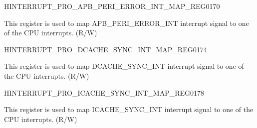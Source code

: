 \begin{register}{H}{INTERRUPT\_PRO\_APB\_PERI\_ERROR\_INT\_MAP\_REG}{\hexprefix{}0170}\label{regdesc:INTERRUPTPROAPBPERIERRORINTMAPREG}
%
%
\regnewline%
\begin{regdesc}\begin{reglist}
\label{fielddesc:INTERRUPTPROAPBPERIERRORINTMAP}\item [INTERRUPT\_PRO\_APB\_PERI\_ERROR\_INT\_MAP] This register is used to map APB\_PERI\_ERROR\_INT interrupt signal to one of the CPU interrupts. (R/W)
\end{reglist}\end{regdesc}
\end{register}


\begin{register}{H}{INTERRUPT\_PRO\_DCACHE\_SYNC\_INT\_MAP\_REG}{\hexprefix{}0174}\label{regdesc:INTERRUPTPRODCACHESYNCINTMAPREG}
%
%
\regnewline%
\begin{regdesc}\begin{reglist}
\label{fielddesc:INTERRUPTPRODCACHESYNCINTMAP}\item [INTERRUPT\_PRO\_DCACHE\_SYNC\_INT\_MAP] This register is used to map DCACHE\_SYNC\_INT interrupt signal to one of the CPU interrupts. (R/W)
\end{reglist}\end{regdesc}
\end{register}


\begin{register}{H}{INTERRUPT\_PRO\_ICACHE\_SYNC\_INT\_MAP\_REG}{\hexprefix{}0178}\label{regdesc:INTERRUPTPROICACHESYNCINTMAPREG}
%
%
\regnewline%
\begin{regdesc}\begin{reglist}
\label{fielddesc:INTERRUPTPROICACHESYNCINTMAP}\item [INTERRUPT\_PRO\_ICACHE\_SYNC\_INT\_MAP] This register is used to map ICACHE\_SYNC\_INT interrupt signal to one of the CPU interrupts. (R/W)
\end{reglist}\end{regdesc}
\end{register}


